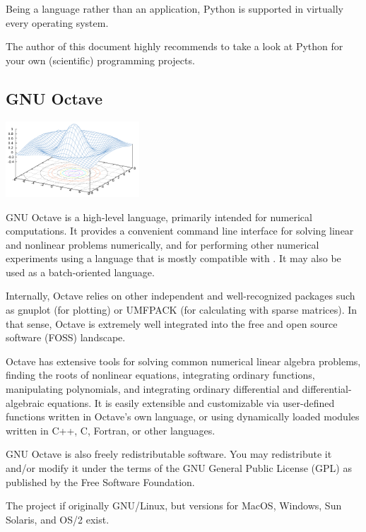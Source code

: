 Being a language rather than an application, Python is supported in virtually
every operating system.

The author of this document highly recommends to take a look at Python for
your own (scientific) programming projects.


\subsection{GNU Octave}

\begin{floatingfigure}[r]{5cm}
\centering
\includegraphics[width=5cm]{figures/Octave_Sombrero}
\end{floatingfigure}

GNU Octave is a high-level language, primarily intended for numerical
computations. It provides a convenient command line interface for solving
linear and nonlinear problems numerically, and for performing other numerical
experiments using a language that is mostly compatible with \matlab{}. It may
also be used as a batch-oriented language.

Internally, Octave relies on other independent and well-recognized packages
such as gnuplot (for plotting) or UMFPACK (for calculating with sparse
matrices). In that sense, Octave is extremely well integrated into the free
and open source software (FOSS) landscape.

Octave has extensive tools for solving common numerical linear algebra
problems, finding the roots of nonlinear equations, integrating ordinary
functions, manipulating polynomials, and integrating ordinary differential and
differential-algebraic equations. It is easily extensible and customizable via
user-defined functions written in Octave's own language, or using dynamically
loaded modules written in C++, C, Fortran, or other languages.

GNU Octave is also freely redistributable software. You may redistribute it
and/or modify it under the terms of the GNU General Public License (GPL) as
published by the Free Software Foundation.

The project if originally GNU/Linux, but versions for MacOS, Windows, Sun
Solaris, and OS/2 exist.


